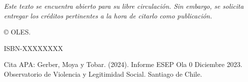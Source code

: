 \null\vfill
\begin{flushleft}
\thispagestyle{empty}
\textit{Este texto se encuentra abierto para su libre circulación. Sin embargo, se solicita entregar los créditos pertinentes a la hora de citarlo como publicación.}

© OLES. 

ISBN-XXXXXXXX

\noindent Cita APA: Gerber, Moya y Tobar. (2024). Informe ESEP Ola 0 Diciembre 2023.  Observatorio de Violencia y Legitimidad Social. Santiago de Chile.

\end{flushleft}
